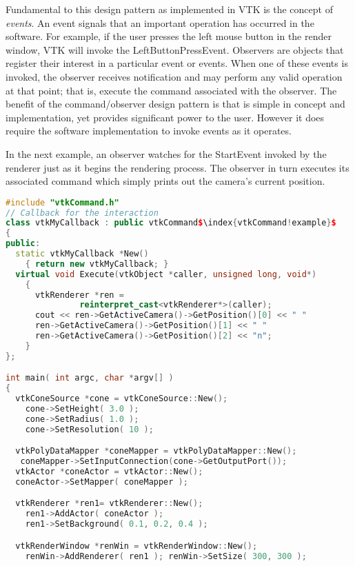 \begin{description}[leftmargin=0cm,labelindent=0cm]
Fundamental to this design pattern as implemented in VTK is the concept of \emph{events}. An event signals that an important operation has occurred in the software. For example, if the user presses the left mouse button in the render window, VTK will invoke the LeftButtonPressEvent. Observers are objects that register their interest in a particular event or events. When one of these events is invoked, the observer receives notification and may perform any valid operation at that point; that is, execute the command associated with the observer. The benefit of the command/observer design pattern is that is simple in concept and implementation, yet provides significant power to the user. However it does require the software implementation to invoke events as it operates.

In the next example, an observer watches for the StartEvent invoked by the renderer just as it begins the rendering process. The observer in turn executes its associated command which simply prints out the camera's current position.

\begin{lstlisting}[language=C++, caption={}, escapechar=\$]
#include "vtkCommand.h"
// Callback for the interaction
class vtkMyCallback : public vtkCommand$\index{vtkCommand!example}$
{
public:
  static vtkMyCallback *New()
    { return new vtkMyCallback; }
  virtual void Execute(vtkObject *caller, unsigned long, void*)
    {
      vtkRenderer *ren =
               reinterpret_cast<vtkRenderer*>(caller);
      cout << ren->GetActiveCamera()->GetPosition()[0] << " "
      ren->GetActiveCamera()->GetPosition()[1] << " "
      ren->GetActiveCamera()->GetPosition()[2] << "n";
    }
};

int main( int argc, char *argv[] )
{
  vtkConeSource *cone = vtkConeSource::New();
    cone->SetHeight( 3.0 );
    cone->SetRadius( 1.0 );
    cone->SetResolution( 10 );

  vtkPolyDataMapper *coneMapper = vtkPolyDataMapper::New();
   coneMapper->SetInputConnection(cone->GetOutputPort());
  vtkActor *coneActor = vtkActor::New();
  coneActor->SetMapper( coneMapper );

  vtkRenderer *ren1= vtkRenderer::New();
    ren1->AddActor( coneActor );
    ren1->SetBackground( 0.1, 0.2, 0.4 );

  vtkRenderWindow *renWin = vtkRenderWindow::New();
    renWin->AddRenderer( ren1 ); renWin->SetSize( 300, 300 );


\end{lstlisting}
\end{description}
